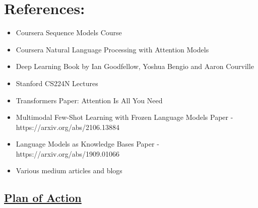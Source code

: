 \documentclass{article}
\begin{document}
\section*{\Huge References:}
\begin{itemize}
    \Large \justifying
    \item Coursera Sequence Models Course
    \item Coursera Natural Language Processing with Attention Models 
    \item Deep Learning Book by Ian Goodfellow, Yoshua Bengio and Aaron Courville
    \item Stanford CS224N Lectures
    \item Transformers Paper: Attention Is All You Need
    \item Multimodal Few-Shot Learning with Frozen Language Models Paper - https://arxiv.org/abs/2106.13884
    \item Language Models as Knowledge Bases Paper - https://arxiv.org/abs/1909.01066

    \item Various medium articles and blogs
\end{itemize}

\newpage

\begin{center}
    \section*{\Huge \underline{Plan of Action}}
\end{center}

\vspace{0.5cm}
\end{document}
